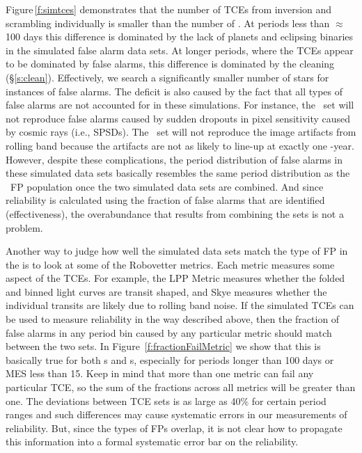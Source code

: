 Figure\,\ref{f:simtces} demonstrates that the number of TCEs from inversion and scrambling individually is smaller than the number of \opstces. At periods less than $\approx$100 days this difference is dominated by the lack of planets and eclipsing binaries in the simulated false alarm data sets.  At longer periods, where the TCEs appear to be dominated by false alarms, this difference is dominated by the cleaning (\S\ref{s:clean}). Effectively, we search a significantly smaller number of stars for instances of false alarms. The deficit is also caused by the fact that all types of false alarms are not accounted for in these simulations. For instance, the \invtce\ set will not reproduce false alarms caused by sudden dropouts in pixel sensitivity caused by cosmic rays (i.e., SPSDs). The \scrtce\ set will not reproduce the image artifacts from rolling band because the artifacts are not as likely to line-up at exactly one \Kepler -year.  However, despite these complications, the period distribution of false alarms in these simulated data sets basically resembles the same period distribution as the \opstce\ FP population once the two simulated data sets are combined. And since reliability is calculated using the fraction of false alarms that are identified (effectiveness), the overabundance that results from combining the sets is not a problem.

Another way to judge how well the simulated data sets match the type of FP in the  is to look at some of the Robovetter metrics.  Each metric measures some aspect of the TCEs. For example, the LPP Metric measures whether the folded and binned light curves are transit shaped, and Skye measures whether the individual transits are likely due to rolling band noise.  If the simulated TCEs can be used to measure reliability in the way described above, then the fraction of false alarms in any period bin caused by any particular metric should match between the two sets.  In Figure~\ref{f:fractionFailMetric} we show that this is basically true for both \invtce s and \scrtce s, especially for periods longer than 100 days or MES less than 15.  Keep in mind that more than one metric can fail any particular TCE, so the sum of the fractions across all metrics will be greater than one.  The deviations between TCE sets is as large as 40\% for certain period ranges and such differences may cause systematic errors in our measurements of reliability.  But, since the types of FPs overlap, it is not clear how to propagate this information into a formal systematic error bar on the reliability.  


